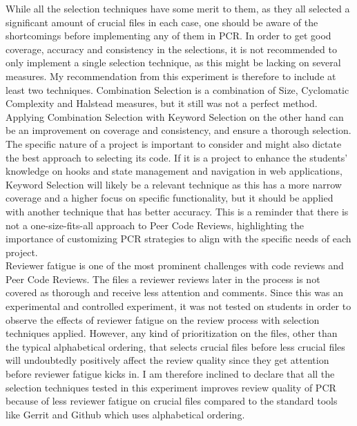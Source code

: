 While all the selection techniques have some merit to them, as they all selected a significant amount of crucial files in each case, one should be aware of the shortcomings before implementing any of them in PCR. In order to get good coverage, accuracy and consistency in the selections, it is not recommended to only implement a single selection technique, as this might be lacking on several measures. My recommendation from this experiment is therefore to include at least two techniques. Combination Selection is a combination of Size, Cyclomatic Complexity and Halstead measures, but it still was not a perfect method. Applying Combination Selection with Keyword Selection on the other hand can be an improvement on coverage and consistency, and ensure a thorough selection. \\

The specific nature of a project is important to consider and might also dictate the best approach to selecting its code. If it is a project to enhance the students' knowledge on hooks and state management and navigation in web applications, Keyword Selection will likely be a relevant technique as this has a more narrow coverage and a higher focus on specific functionality, but it should be applied with another technique that has better accuracy. This is a reminder that there is not a one-size-fits-all approach to Peer Code Reviews, highlighting the importance of customizing PCR strategies to align with the specific needs of each project. \\


Reviewer fatigue is one of the most prominent challenges with code reviews and Peer Code Reviews. The files a reviewer reviews later in the process is not covered as thorough and receive less attention and comments. Since this was an experimental and controlled experiment, it was not tested on students in order to observe the effects of reviewer fatigue on the review process with selection techniques applied. However, any kind of prioritization on the files, other than the typical alphabetical ordering, that selects crucial files before less crucial files will undoubtedly positively affect the review quality since they get attention before reviewer fatigue kicks in. I am therefore inclined to declare that all the selection techniques tested in this experiment improves review quality of PCR because of less reviewer fatigue on crucial files compared to the standard tools like Gerrit and Github which uses alphabetical ordering. \\

